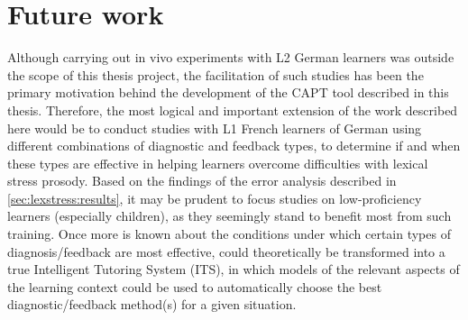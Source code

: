 % 
% 
 
 


\section{Future work}
\label{sec:conclusion:future}

Although carrying out in vivo experiments with L2 German learners was outside the scope of this thesis project, the facilitation of such studies has been the primary motivation behind the development of the  CAPT tool described in this thesis. Therefore, the most logical and important extension of the work described here would be to conduct studies with L1 French learners of German using different combinations of diagnostic and feedback types, to determine if and when these types are effective in helping learners overcome difficulties with lexical stress prosody. 
	Based on the findings of the error analysis described in \cref{sec:lexstress:results}, it may be prudent to focus studies on low-proficiency learners (especially children), as they seemingly stand to benefit most from such training.
	Once more is known about the conditions under which certain types of diagnosis/feedback are most effective,  could theoretically be transformed into a true Intelligent Tutoring System (ITS), in which models of the relevant aspects of the learning context could be used to automatically choose the best diagnostic/feedback method(s) for a given situation.

